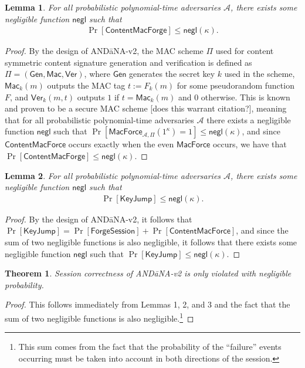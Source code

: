 \documentclass[10pt]{article}
\newtheorem{thm}{\textbf{Theorem}}
\newtheorem{lemma}{\textbf{Lemma}}
\begin{document}
\begin{lemma}
For all probabilistic polynomial-time adversaries $\mathcal{A}$, there exists some negligible function $\mathsf{negl}$ such that
\begin{align*}
\Pr[\mathsf{ContentMacForge}] \leq \mathsf{negl}(\kappa).
\end{align*}
\end{lemma}
\begin{proof}
By the design of {\sf AND\=aNA-v2}, the MAC scheme $\Pi$ used for content symmetric content signature generation and verification is defined as $\Pi = (\mathsf{Gen}, \mathsf{Mac}, \mathsf{Ver})$, where $\mathsf{Gen}$ generates the secret key $k$ used in the scheme, $\mathsf{Mac}_k(m)$ outputs the MAC tag $t := F_k(m)$ for some pseudorandom function $F$, and $\mathsf{Ver}_k(m, t)$ outputs $1$ if $t = \mathsf{Mac}_k(m)$ and $0$ otherwise. This is known and proven to be a secure MAC scheme [does this warrant citation?], meaning that for all probabilistic polynomial-time adversaries $\mathcal{A}$ there exists a negligible function $\mathsf{negl}$ such that $\Pr[\mathsf{MacForce}_{\mathcal{A},\Pi}(1^{\kappa}) = 1] \leq \mathsf{negl}(\kappa)$, and since $\mathsf{ContentMacForce}$ occurs exactly when the even $\mathsf{MacForce}$ occurs, we have that $\Pr[\mathsf{ContentMacForge}] \leq \mathsf{negl}(\kappa)$.

\end{proof}

\begin{lemma}
For all probabilistic polynomial-time adversaries $\mathcal{A}$, there exists some negligible function $\mathsf{negl}$ such that
\begin{align*}
\Pr[\mathsf{KeyJump}] \leq \mathsf{negl}(\kappa).
\end{align*}
\end{lemma}
\begin{proof}
By the design of {\sf AND\=aNA-v2}, it follows that $\Pr[\mathsf{KeyJump}] = \Pr[\mathsf{ForgeSession}] + \Pr[\mathsf{ContentMacForce}]$, and since the sum of two negligible functions is also negligible, it follows that there exists some negligible function $\mathsf{negl}$ such that $\Pr[\mathsf{KeyJump}] \leq \mathsf{negl}(\kappa)$.
\end{proof}

\begin{thm}
Session correctness of {\sf AND\=aNA-v2} is only violated with negligible probability.
\end{thm}
\begin{proof}
This follows immediately from Lemmas 1, 2, and 3 and the fact that the sum of two negligible functions is also negligible.\footnote{This sum comes from the fact that the probability of the ``failure'' events occurring must be taken into account in both directions of the session.} 
\end{proof}
\end{document}
